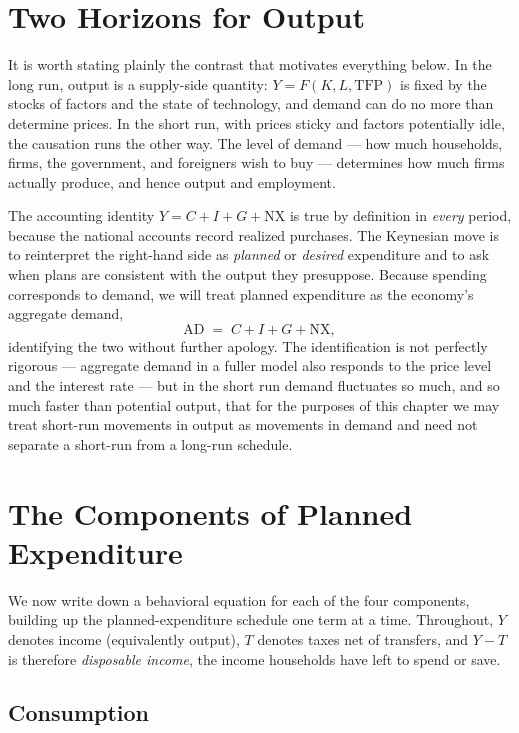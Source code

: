 \section{Two Horizons for Output}

It is worth stating plainly the contrast that motivates everything below. In the long run, output is a supply-side quantity: $Y = F(K, L, \mathrm{TFP})$ is fixed by the stocks of factors and the state of technology, and demand can do no more than determine prices. In the short run, with prices sticky and factors potentially idle, the causation runs the other way. The level of demand --- how much households, firms, the government, and foreigners wish to buy --- determines how much firms actually produce, and hence output and employment.

The accounting identity $Y = C + I + G + \mathrm{NX}$ is true by definition in \emph{every} period, because the national accounts record realized purchases. The Keynesian move is to reinterpret the right-hand side as \emph{planned} or \emph{desired} expenditure and to ask when plans are consistent with the output they presuppose. Because spending corresponds to demand, we will treat planned expenditure as the economy's aggregate demand,
\[
\mathrm{AD} \;=\; C + I + G + \mathrm{NX},
\]
identifying the two without further apology. The identification is not perfectly rigorous --- aggregate demand in a fuller model also responds to the price level and the interest rate --- but in the short run demand fluctuates so much, and so much faster than potential output, that for the purposes of this chapter we may treat short-run movements in output as movements in demand and need not separate a short-run from a long-run schedule.

\section{The Components of Planned Expenditure}

We now write down a behavioral equation for each of the four components, building up the planned-expenditure schedule one term at a time. Throughout, $Y$ denotes income (equivalently output), $T$ denotes taxes net of transfers, and $Y - T$ is therefore \emph{disposable income}, the income households have left to spend or save.

\subsection{Consumption}

